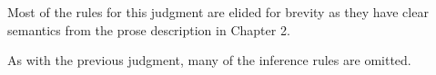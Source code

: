 Most of the rules for this judgment are elided for brevity as they have clear semantics from the prose description in Chapter 2.
\begin{mathpar}










\end{mathpar}
As with the previous judgment, many of the inference rules are omitted.
\begin{mathpar}






\end{mathpar}
